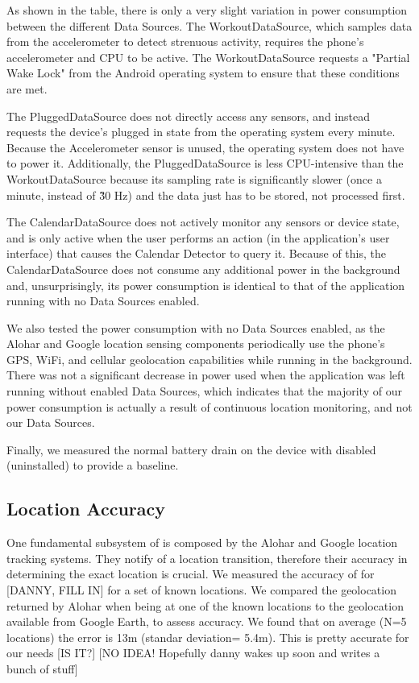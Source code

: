 \documentclass{acm_proc_article-sp}
\begin{document}
As shown in the table, there is only a very slight variation in power consumption between the different Data Sources. The WorkoutDataSource, which samples data from the accelerometer to detect strenuous activity, requires the phone's accelerometer and CPU to be active. The WorkoutDataSource requests a "Partial Wake Lock" from the Android operating system to ensure that these conditions are met.

The PluggedDataSource does not directly access any sensors, and instead requests the device's plugged in state from the operating system every minute. Because the Accelerometer sensor is unused, the operating system does not have to power it. Additionally, the PluggedDataSource is less CPU-intensive than the WorkoutDataSource because its sampling rate is significantly slower (once a minute, instead of \~30 Hz) and the data just has to be stored, not processed first.

The CalendarDataSource does not actively monitor any sensors or device state, and is only active when the user performs an action (in the application's user interface) that causes the Calendar Detector to query it. Because of this, the CalendarDataSource does not consume any additional power in the background and, unsurprisingly, its power consumption is identical to that of the application running with no Data Sources enabled.

We also tested the power consumption with no Data Sources enabled, as the Alohar and Google location sensing components periodically use the phone's GPS, WiFi, and cellular geolocation capabilities while running in the background. There was not a significant decrease in power used when the application was left running without enabled Data Sources, which indicates that the majority of our power consumption is actually a result of continuous location monitoring, and not our Data Sources.

Finally, we measured the normal battery drain on the device with \LS disabled (uninstalled) to provide a baseline.

\subsection{Location Accuracy}
One fundamental subsystem of \LS is composed by the Alohar and Google location tracking systems. They notify \LS of a location transition, therefore their accuracy in determining the exact location is crucial. We measured the accuracy of \LS for [DANNY, FILL IN] for a set of known locations. We compared the geolocation returned by Alohar when being at one of the known locations to the geolocation available from Google Earth, to assess accuracy. 
We found that on average (N=5 locations) the error is 13m (standar deviation= 5.4m). This is pretty accurate for our needs [IS IT?]
[NO IDEA! Hopefully danny wakes up soon and writes a bunch of stuff]
\end{document}
